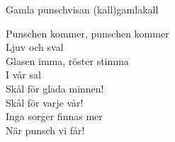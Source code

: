 \begin{song}{Gamla punschvisan (kall)}{gamlakall}
\begin{vers}
Punschen kommer, punschen kommer\\
Ljuv och sval\\
Glasen imma, röster stimma\\
I vår sal\\
Skål för glada minnen!\\
Skål för varje vår!\\
Inga sorger finnas mer\\
När punsch vi får!\\
\end{vers}
\end{song}
